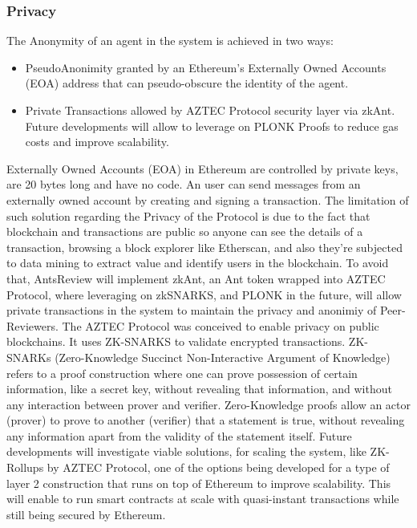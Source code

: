 \documentclass[runningheads]{llncs}
\begin{document}
\subsubsection{Privacy}

The Anonymity of an agent in the system is achieved in two ways:

\begin{itemize}
  \item PseudoAnonimity granted by an Ethereum's Externally Owned Accounts (EOA) address that can pseudo-obscure the identity of the agent.
  \item Private Transactions allowed by AZTEC Protocol security layer via zkAnt. Future developments will allow to leverage on PLONK Proofs to reduce gas costs and improve scalability.
\end{itemize}

 Externally Owned Accounts (EOA) in Ethereum are controlled by private keys, are 20 bytes long and have no code. An user can send messages from an externally owned account by creating and signing a transaction.
\newline The limitation of such solution regarding the Privacy of the Protocol is due to the fact that blockchain and transactions are public so anyone can see the details of a transaction, browsing a block explorer like Etherscan, and also they're subjected to data mining to extract value and identify users in the blockchain.
\newline To avoid that, AntsReview will implement zkAnt, an Ant token wrapped into AZTEC Protocol, where leveraging on zkSNARKS, and PLONK in the future, will allow private transactions in the system to maintain the privacy and anonimiy of Peer-Reviewers.
\newline The AZTEC Protocol was conceived to enable privacy on public blockchains. It uses ZK-SNARKS to validate encrypted transactions.
\newline ZK-SNARKs (Zero-Knowledge Succinct Non-Interactive Argument of Knowledge) refers to a proof construction where one can prove possession of certain information, like a secret key, without revealing that information, and without any interaction between prover and verifier.
\newline Zero-Knowledge proofs allow an actor (prover) to prove to another (verifier) that a statement is true, without revealing any information apart from the validity of the statement itself.
\newline Future developments will investigate viable solutions, for scaling the system, like ZK-Rollups by AZTEC Protocol, one of the options being developed for a type of layer 2 construction that runs on top of Ethereum to improve scalability. This will enable to run smart contracts at scale with quasi-instant transactions while still being secured by Ethereum.
\end{document}
